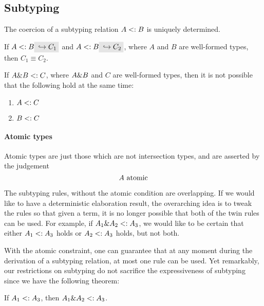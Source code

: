 \subsection{Subtyping}

The coercion of a subtyping relation $A <: B$ is uniquely determined.

\begin{lemma} \label{unique-coercion}
  If $A \subtype B \yields {C_1}$ and $A \subtype B \yields {C_2}$, where $A$
  and $B$ are well-formed types, then $C_1 \equiv C_2$.
\end{lemma}


\begin{lemma}
  \label{unique-subtype-contributor}
  If $A \& B <: C$, where $A \& B$ and $C$ are well-formed types,
  then it is not possible that the following hold at the same time:
\begin{enumerate}
\item $A <: C$
\item $B <: C$
\end{enumerate}
\end{lemma}

\paragraph{Atomic types} Atomic types are just those which are not intersection
types, and are asserted by the judgement \[ A \ \text{atomic} \]

The subtyping rules, without the atomic condition are overlapping. If we would
like to have a deterministic elaboration result, the overarching idea is to
tweak the rules so that given a term, it is no longer possible that both of the
twin rules can be used. For example, if $A_1 \& A_2 <: A_3$, we would
like to be certain that either $A_1 <: A_3$ holds or $A_2 <: A_3$
holds, but not both.

With the atomic constraint, one can guarantee that at any moment during the
derivation of a subtyping relation, at most one rule can be used. Yet
remarkably, our restrictions on subtyping do not sacrifice the expressiveness of
subtyping since we have the following theorem:
\begin{theorem}
  If $A_1 <: A_3$, then $A_1 \& A_2 <: A_3$.
\end{theorem}

